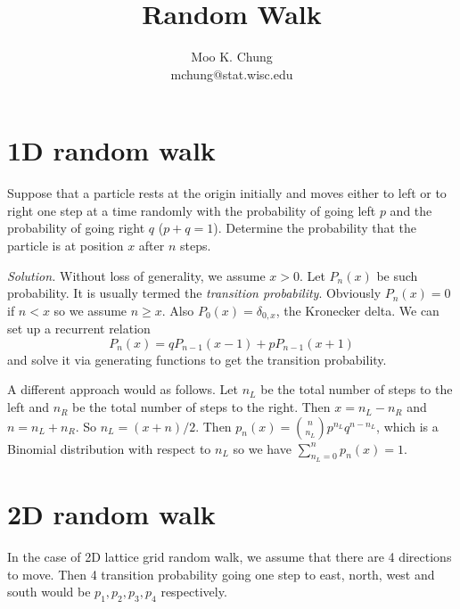 \documentclass[12pt]{article} %
\begin{document}
\title{Random Walk}
\author{Moo K. Chung\\
mchung@stat.wisc.edu}
\maketitle \thispagestyle{empty} \section*{1D random walk} Suppose
that a particle rests at the origin initially and moves either to
left or to right one step at a time randomly with the probability
of going left $p$ and the probability of going right $q$
($p+q=1$). Determine the probability that the particle is at
position $x$ after $n$ steps.

{\em Solution.} Without loss of generality, we assume $x > 0$. Let
$P_n(x)$ be such probability. It is usually termed the {\em
transition probability}. Obviously $P_n(x) = 0$ if $n < x$ so we
assume $n \geq x$. Also $P_0(x)=\delta_{0,x}$, the Kronecker
delta. We can set up a recurrent relation
$$P_n(x) = qP_{n-1}(x-1) +pP_{n-1}(x+1)$$
and solve it via generating functions to get the transition
probability.

A different approach would as follows. Let $n_L$ be the total
number of steps to the left and $n_R$ be the total number of steps
to the right. Then $x=n_L-n_R$ and $n=n_L + n_R$. So $n_L =
(x+n)/2$. Then $p_n(x)={n \choose n_L}p^{n_L}q^{n-n_L}$, which is
a Binomial distribution with respect to $n_L$ so we have
$\sum_{n_L=0}^n p_n(x) =1$. 


\section*{2D random walk}
In the case of 2D lattice grid random walk, we assume that there are 4 directions to move. Then 4 transition probability going one step to east, north, west and south would be $p_1,p_2,p_3,p_4$ respectively. 
\end{document}
